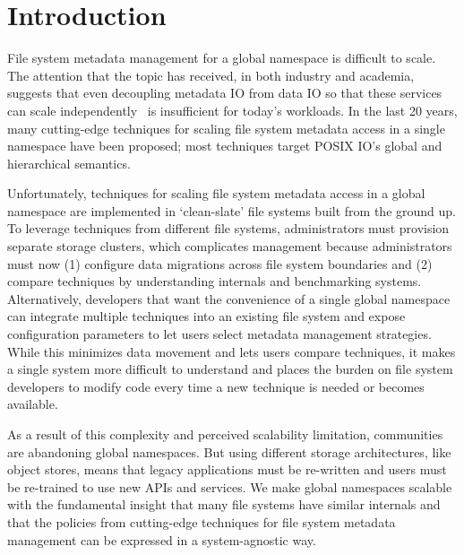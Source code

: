 \chapter{Introduction}

File system metadata management for a global namespace is difficult to scale.
The attention that the topic has received, in both industry and academia,
suggests that even decoupling metadata IO from data IO so that these services
can scale independently~\cite{alam:pdsw2011-metadata-scaling,
ghemawat:sosp2003-gfs, hildebrand:msst2005-pnfs, weil:osdi2006-ceph,
welch:fast2008-panasas, xing:sc2009-skyfs} is insufficient for today's
workloads. In the last 20 years, many cutting-edge techniques for scaling file
system metadata access in a single namespace have been proposed; most
techniques target POSIX IO's global and hierarchical semantics.

Unfortunately, techniques for scaling file system metadata access in a global
namespace are implemented in `clean-slate' file systems built from the ground
up. To leverage techniques from different file systems, administrators must
provision separate storage clusters, which complicates management because
administrators must now (1) configure data migrations across file system
boundaries and (2) compare techniques by understanding internals and
benchmarking systems.  Alternatively, developers that want the convenience of a
single global namespace can integrate multiple techniques into an existing file
system and expose configuration parameters to let users select metadata
management strategies.  While this minimizes data movement and lets users
compare techniques, it makes a single system more difficult to understand and
places the burden on file system developers to modify code every time a new
technique is needed or becomes available.

As a result of this complexity and perceived scalability limitation,
communities are abandoning global namespaces. But using different storage
architectures, like object stores, means that legacy applications must be
re-written and users must be re-trained to use new APIs and services. We make
global namespaces scalable with the fundamental insight that many file systems
have similar internals and that the policies from cutting-edge techniques for
file system metadata management can be expressed in a system-agnostic way.

